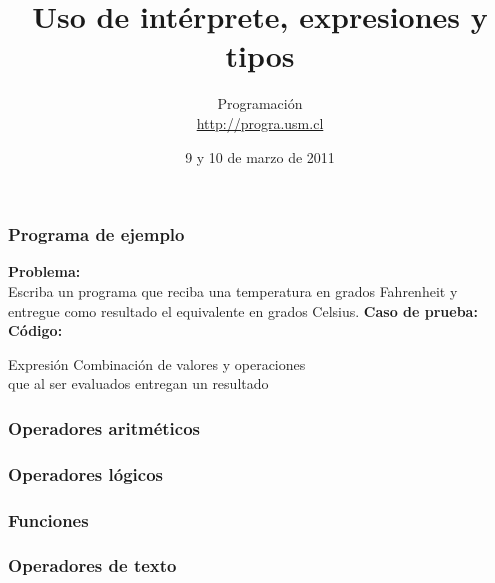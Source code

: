 \documentclass[12pt]{beamer}
\title{Uso de intérprete, expresiones y tipos}
\author{
  Programación \\ \url{http://progra.usm.cl}
}
\date{9 y 10 de marzo de 2011}
\begin{document}
  \begin{frame}
    \maketitle
  \end{frame}

  \begin{frame}
    \frametitle{Programa de ejemplo}
    \label{prog-ejemplo}

    \textbf{Problema:}\\
    Escriba un programa que reciba una temperatura en grados Fahrenheit
    y entregue como resultado el equivalente en grados Celsius.
    \vfill
    \textbf{Caso de prueba:}\\
    
    \vfill
    \textbf{Código:}\\
    
  \end{frame}

  \begin{frame}
    \label{expresion}
    \begin{block}{Expresión}
      Combinación de valores y operaciones \\
      que al ser evaluados entregan un resultado
    \end{block}
    
  \end{frame}

  \begin{frame}
    \frametitle{Operadores aritméticos}
    \label{operadores-aritmeticos}
    
  \end{frame}

  \begin{frame}
    \frametitle{Operadores lógicos}
    \label{operadores-logicos}
    
  \end{frame}

  \begin{frame}
    \frametitle{Funciones}
    \label{funciones}
    
  \end{frame}

  \begin{frame}
    \frametitle{Operadores de texto}
    \label{operadores-texto}
    
  \end{frame}
\end{document}
